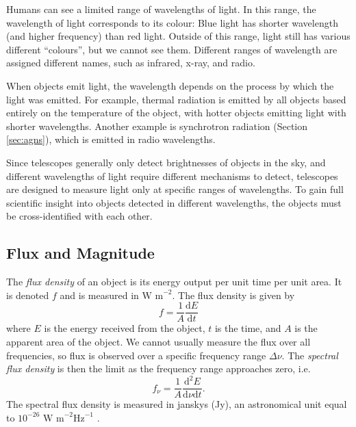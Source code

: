             Humans can see a limited range of wavelengths of light. In this
            range, the wavelength of light corresponds to its colour: Blue light
            has shorter wavelength (and higher frequency) than red light.
            Outside of this range, light still has various different
            ``colours'', but we cannot see them. Different ranges of wavelength
            are assigned different names, such as infrared, x-ray, and radio.

            When objects emit light, the wavelength depends on the process by
            which the light was emitted. For example, thermal radiation is
            emitted by all objects based entirely on the temperature of the
            object, with hotter objects emitting light with shorter wavelengths.
            Another example is synchrotron radiation (Section \ref{sec:agns}),
            which is emitted in radio wavelengths.

            Since telescopes generally only detect brightnesses of objects in
            the sky, and different wavelengths of light require different
            mechanisms to detect, telescopes are designed to measure light only
            at specific ranges of wavelengths. To gain full scientific insight
            into objects detected in different wavelengths, the objects must be
            cross-identified with each other.

        \subsection{Flux and Magnitude}

            The \emph{flux density} of an object is its energy output per unit
            time per unit area. It is denoted $f$ and is measured in $\text{W
            m}^{-2}$. The flux density is given by
            \[
                f = \frac{1}{A}\frac{\text{d}E}{\text{d}t}
            \]
            where $E$ is the energy received from the object, $t$ is the time,
            and $A$ is the apparent area of the object. We cannot usually
            measure the flux over all frequencies, so flux is observed over a
            specific frequency range $\Delta \nu$. The \emph{spectral flux
            density} is then the limit as the frequency range approaches zero,
            i.e.
            \[
                f_\nu = \frac{1}{A}\frac{\text{d}^2E}{\text{d}\nu\text{d}t}.
            \]
            The spectral flux density is measured in janskys (Jy), an
            astronomical unit equal to $10^{-26} \text{ W m}^{-2} \text{
            Hz}^{-1}$ \citep{francis08}.

